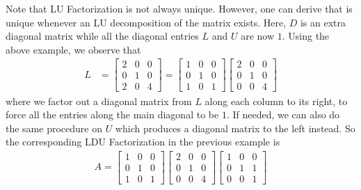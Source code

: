 Note that LU Factorization is not always unique. However, one can derive  that is unique whenever an LU decomposition of the matrix exists. Here, $D$ is an extra diagonal matrix while all the diagonal entries $L$ and $U$ are now $1$. Using the above example, we observe that
\begin{align*}
L &=
\begin{bmatrix}
2 & 0 & 0 \\
0 & 1 & 0 \\
2 & 0 & 4
\end{bmatrix} = 
\begin{bmatrix}
1 & 0 & 0 \\
0 & 1 & 0 \\
1 & 0 & 1
\end{bmatrix}
\begin{bmatrix}
2 & 0 & 0 \\
0 & 1 & 0 \\
0 & 0 & 4
\end{bmatrix}
\end{align*}
where we factor out a diagonal matrix from $L$ along each column to its right, to force all the entries along the main diagonal to be $1$. If needed, we can also do the same procedure on $U$ which produces a diagonal matrix to the left instead. So the corresponding LDU Factorization in the previous example is
\begin{align*}
A =
\begin{bmatrix}
1 & 0 & 0 \\
0 & 1 & 0 \\
1 & 0 & 1
\end{bmatrix}
\begin{bmatrix}
2 & 0 & 0 \\
0 & 1 & 0 \\
0 & 0 & 4
\end{bmatrix}
\begin{bmatrix}
1 & 0 & 0 \\
0 & 1 & 1 \\
0 & 0 & 1 
\end{bmatrix}
\end{align*}

